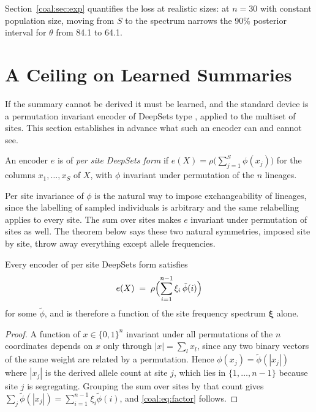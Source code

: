 Section~\ref{coal:sec:exp} quantifies the loss at realistic sizes: at $n=30$ with constant population size, moving from $S$ to the spectrum narrows the 90\% posterior interval for $\theta$ from 84.1 to 64.1.

\section{A Ceiling on Learned Summaries}\label{coal:sec:ceiling}

If the summary cannot be derived it must be learned, and the standard device is a permutation invariant encoder of DeepSets type \citep{coal:zaheer2017}, applied to the multiset of sites. This section establishes in advance what such an encoder can and cannot see.

\begin{definition}\label{coal:def:deepsets}
An encoder $e$ is of \emph{per site DeepSets form} if $e(X)=\rho\bigl(\sum_{j=1}^S\phi(x_j)\bigr)$ for the columns $x_1,\dots,x_S$ of $X$, with $\phi$ invariant under permutation of the $n$ lineages.
\end{definition}

Per site invariance of $\phi$ is the natural way to impose exchangeability of lineages, since the labelling of sampled individuals is arbitrary and the same relabelling applies to every site. The sum over sites makes $e$ invariant under permutation of sites as well. The theorem below says these two natural symmetries, imposed site by site, throw away everything except allele frequencies.

\begin{theorem}\label{coal:thm:deepsets}
Every encoder of per site DeepSets form satisfies
\begin{equation}\label{coal:eq:factor}
e(X)\;=\;\rho\Bigl(\sum_{i=1}^{n-1}\xi_i\,\tilde\phi(i)\Bigr)
\end{equation}
for some $\tilde\phi$, and is therefore a function of the site frequency spectrum $\bm{\xi}$ alone.
\end{theorem}

\begin{proof}
A function of $x\in\{0,1\}^n$ invariant under all permutations of the $n$ coordinates depends on $x$ only through $|x|=\sum_l x_l$, since any two binary vectors of the same weight are related by a permutation. Hence $\phi(x_j)=\tilde\phi(|x_j|)$ where $|x_j|$ is the derived allele count at site $j$, which lies in $\{1,\dots,n-1\}$ because site $j$ is segregating. Grouping the sum over sites by that count gives $\sum_j\tilde\phi(|x_j|)=\sum_{i=1}^{n-1}\xi_i\tilde\phi(i)$, and \eqref{coal:eq:factor} follows.
\end{proof}

